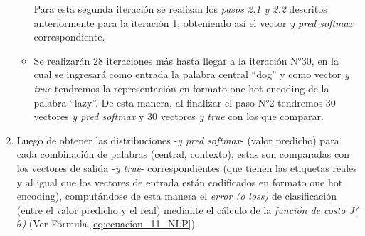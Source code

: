 \documentclass[12pt,a4paper]{article}
\begin{document}
\begin{sloppypar}
\begin{enumerate}
\begin{itemize}
Para esta segunda iteración se realizan los \textit{pasos 2.1 y 2.2} descritos anteriormente para la iteración 1, obteniendo así el vector \textit{y pred softmax} correspondiente.
 
\item Se realizarán 28 iteraciones más hasta llegar a la iteración N°30, en la cual se ingresará como entrada la palabra central “dog” y como vector \textit{y true} tendremos la representación en formato one hot encoding de la palabra “lazy”. De esta manera, al finalizar el paso N°2 tendremos 30 vectores \textit{y pred softmax} y 30 vectores \textit{y true} con los que comparar.
\end{itemize}
      
\item Luego de obtener las distribuciones -\textit{y pred softmax}- (valor predicho) para cada combinación de palabras (central, contexto), estas son comparadas con los vectores de salida -\textit{y true}- correspondientes (que tienen las etiquetas reales y al igual que los vectores de entrada están codificados en formato one hot encoding), computándose de esta manera el \textit{error (o loss)} de clasificación (entre el valor predicho y el real) mediante el cálculo de la \textit{función de costo J($\theta$)} (Ver Fórmula \ref{eq:ecuacion_11_NLP}).


\end{enumerate}
\end{sloppypar}
\end{document}
